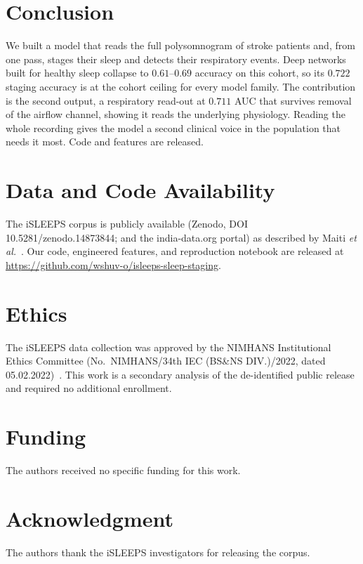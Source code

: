 \documentclass[journal]{IEEEtran}
\newcommand{\mmAcc}{0.722}
\newcommand{\mmAuc}{0.711}
\begin{document}
\section{Conclusion}
We built a model that reads the full polysomnogram of stroke patients and, from one pass,
stages their sleep and detects their respiratory events. Deep networks built for healthy sleep
collapse to $0.61$--$0.69$ accuracy on this cohort, so its $\mmAcc$ staging accuracy is at the
cohort ceiling for every model family. The contribution is the second output, a respiratory
read-out at $\mmAuc$ AUC that survives removal of the airflow channel, showing it reads the
underlying physiology. Reading the whole recording gives the model a second clinical voice in the
population that needs it most. Code and features are released.

\section*{Data and Code Availability}
The iSLEEPS corpus is publicly available (Zenodo, DOI 10.5281/zenodo.14873844; and the
india-data.org portal) as described by Maiti \textit{et al.}~\cite{maiti2026isleeps}. Our
code, engineered features, and reproduction notebook are released at
\url{https://github.com/wshuv-o/isleeps-sleep-staging}.

\section*{Ethics}
The iSLEEPS data collection was approved by the NIMHANS Institutional Ethics Committee
(No.\ NIMHANS/34th IEC (BS\&NS DIV.)/2022, dated 05.02.2022)~\cite{maiti2026isleeps}. This work
is a secondary analysis of the de-identified public release and required no additional
enrollment.

\section*{Funding}
The authors received no specific funding for this work.

\section*{Acknowledgment}
The authors thank the iSLEEPS investigators for releasing the corpus.



\end{document}
